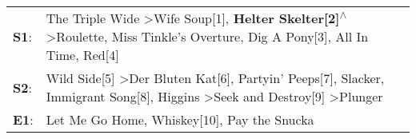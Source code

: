 \begin{supertabular}{p{0.03\textwidth}p{0.92\textwidth}}
 \textbf{S1}:  &  The Triple Wide\textsuperscript{} \textgreater \enspace Wife Soup[1]\textsuperscript{}, \enspace \textbf{Helter Skelter[2]\textsuperscript{$\wedge$}} \textgreater \enspace Roulette\textsuperscript{}, \enspace Miss Tinkle's Overture\textsuperscript{}, \enspace Dig A Pony[3]\textsuperscript{}, \enspace All In Time\textsuperscript{}, \enspace Red[4]\textsuperscript{}  \enspace  \\
 \textbf{S2}:  &        Wild Side[5]\textsuperscript{} \textgreater \enspace Der Bluten Kat[6]\textsuperscript{}, \enspace Partyin' Peeps[7]\textsuperscript{}, \enspace Slacker\textsuperscript{}, \enspace Immigrant Song[8]\textsuperscript{}, \enspace Higgins\textsuperscript{} \textgreater \enspace Seek and Destroy[9]\textsuperscript{} \textgreater \enspace Plunger\textsuperscript{}  \enspace  \\
 \textbf{E1}:  &                                                                                                                                                                                                                                                                                        Let Me Go Home, Whiskey[10]\textsuperscript{}, \enspace Pay the Snucka\textsuperscript{}  \enspace  \\
\end{supertabular}
